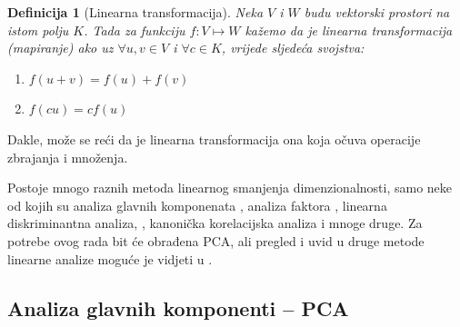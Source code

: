 \documentclass[times, utf8, diplomski]{fer}
\newtheorem{definition}{Definicija}         %
\begin{document}
\begin{definition}[Linearna transformacija]
    Neka $V$ i $W$ budu vektorski prostori na istom polju $K$. Tada za funkciju $f: V \mapsto W$ kažemo da je linearna transformacija (mapiranje) ako uz $\forall u,v \in V$ i $\forall c \in K$, vrijede sljedeća svojstva:

    \mbox{}\vspace{\dimexpr-\baselineskip-\topsep}
    \begin{enumerate}[label=(\roman*)]
        \item $f(u + v) = f(u) + f(v)$
        \item $f(cu) = cf(u)$
    \end{enumerate}
\end{definition}
Dakle, može se reći da je linearna transformacija ona koja očuva operacije zbrajanja i množenja.

Postoje mnogo raznih metoda linearnog smanjenja dimenzionalnosti, samo neke od kojih su analiza glavnih komponenata , analiza faktora , linearna diskriminantna analiza, , kanonička korelacijska analiza  i mnoge druge. Za potrebe ovog rada bit će obrađena PCA, ali pregled i uvid u druge metode linearne analize moguće je vidjeti u \cite{cunningham2015linear}.

\subsection{Analiza glavnih komponenti -- PCA}
\end{document}
